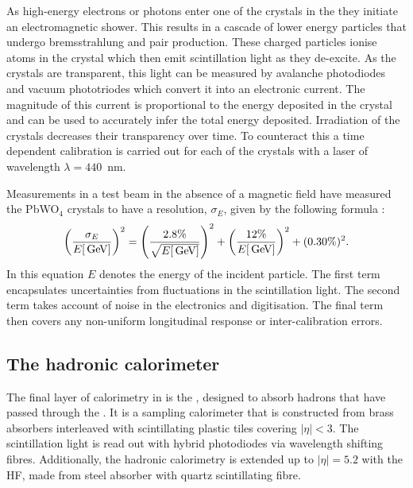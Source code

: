 As high-energy electrons or photons enter one of the crystals in the
\ECAL they initiate an electromagnetic shower. This results in a
cascade of lower energy particles that undergo bremsstrahlung and pair
production.  These charged particles ionise atoms in the crystal which
then emit scintillation light as they de-excite. As the crystals are
transparent, this light can be measured by avalanche photodiodes and
vacuum phototriodes which convert it into an electronic current. The
magnitude of this current is proportional to the energy deposited in
the crystal and can be used to accurately infer the total energy
deposited. Irradiation of the crystals decreases their transparency
over time. To counteract this a time dependent calibration is carried
out for each of the crystals with a laser of wavelength
$\lambda=440$~nm. 

Measurements in a test beam in the absence of a magnetic field have
measured the PbWO$_4$ crystals to have a resolution, $\sigma_E$, given
by the following formula \cite{1748-0221-2-04-P04004}:
\begin{equation} \label{eq:ecalres}
\left(\frac{\sigma_E}{E[\mathrm{\,Ge\kern -0.1em V}]}\right)^2=\left(\frac{2.8\%}
{\sqrt{E[\mathrm{\,Ge\kern -0.1em V}]}}\right)^2+\left(\frac{12\%}{E[\mathrm{\,Ge\kern -0.1em V}]}\right)^2+(0.30\%)^2.
\end{equation} 
In this equation $E$ denotes the energy of the incident
particle. The first term encapsulates uncertainties from fluctuations in the
scintillation light. The second term takes account of noise in the
electronics and digitisation. The final term then covers any
non-uniform longitudinal response or inter-calibration errors. 

\subsection{The hadronic calorimeter} 
\label{sec:hcal}

The final layer of calorimetry in \CMS is the \HCAL \cite{CMS:HCAL},
designed to absorb hadrons that have passed through the \ECAL.
It is a sampling calorimeter that is constructed from brass absorbers
interleaved with scintillating plastic tiles covering $|\eta|<3$. The
scintillation light is read out with hybrid photodiodes via wavelength
shifting fibres.  Additionally, the hadronic calorimetry is extended
up to $|\eta|=5.2$ with the \ac{HF}, made from steel absorber with
quartz scintillating fibre. 

